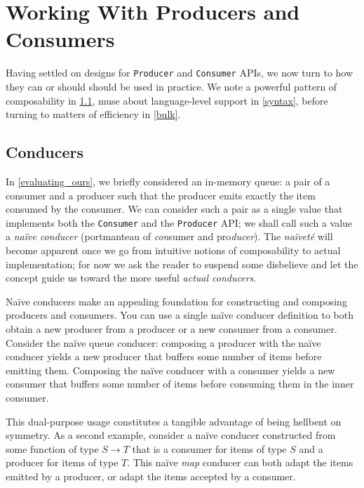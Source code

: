 \documentclass[sigplan,screen,10pt,review]{acmart}
\begin{document}
\section{Working With Producers and Consumers}

Having settled on designs for \texttt{Producer} and \texttt{Consumer} APIs, we now turn to how they can or should should be used in practice. We note a powerful pattern of composability in \cref{conducer}, muse about language-level support in \cref{syntax}, before turning to matters of efficiency in \cref{bulk}.

\subsection{Conducers}\label{conducer}

In \cref{evaluating_ours}, we briefly considered an in-memory queue: a pair of a consumer and a producer such that the producer emits exactly the item consumed by the consumer. We can consider such a pair as a single value that implements both the \texttt{Consumer} and the \texttt{Producer} API; we shall call such a value a \textit{naïve conducer} (portmanteau of \textit{con}sumer and pro\textit{ducer}). The \textit{naïveté} will become apparent once we go from intuitive notions of composability to actual implementation; for now we ask the reader to suspend some disbelieve and let the concept guide us toward the more useful \textit{actual conducers}.

Naïve conducers make an appealing foundation for constructing and composing producers and consumers. You can use a single naïve conducer definition to both obtain a new producer from a producer or a new consumer from a consumer. Consider the naïve queue conducer: composing a producer with the naïve conducer yields a new producer that buffers some number of items before emitting them. Composing the naïve conducer with a consumer yields a new consumer that buffers some number of items before consuming them in the inner consumer.

This dual-purpose usage constitutes a tangible advantage of being hellbent on symmetry. As a second example, consider a naïve conducer constructed from some function of type $S \rightarrow T$ that is a consumer for items of type $S$ and a producer for items of type $T$. This naïve \textit{map} conducer can both adapt the items emitted by a producer, or adapt the items accepted by a consumer.%
\end{document}
